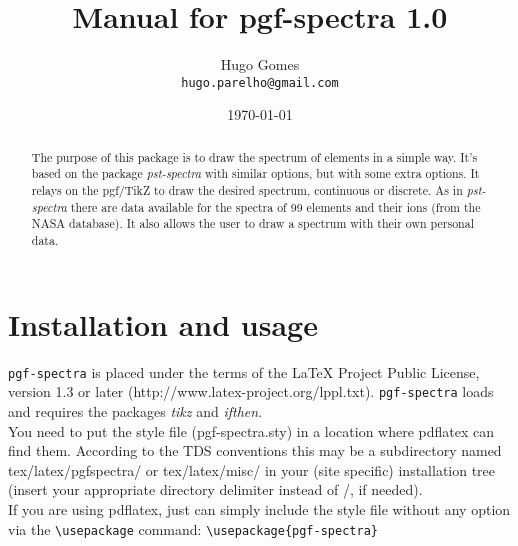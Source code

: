 \documentclass[a4paper,10pt,oneside,openany,fleqno]{article}
\def\pack{\large\texttt{pgf-spectra}\normalsize}
\begin{document}
\title{Manual for pgf-spectra 1.0}
\author{Hugo Gomes\\
  \texttt{hugo.parelho@gmail.com}}
\date{\today}
\maketitle
\begin{center}\pgfspectra[element={B},charge=all,back=visible40,gamma=.6]\end{center}
\begin{abstract}
\noindent The purpose of this package is to draw the spectrum of elements in a simple way. It's based on the package \textit{pst-spectra} with similar options, but with some extra options. It relays on the pgf/TikZ to draw the desired spectrum, continuous or discrete. As in \textit{pst-spectra} there are data available for the spectra of 99 elements and their ions (from the NASA database). It also allows the user to draw a spectrum with their own personal data.
\end{abstract}
\tableofcontents
\newpage
\section{Installation and usage}
\noindent
\pack{} is placed under the terms of the \LaTeX{} Project Public License, version 1.3 or later (http://www.latex-project.org/lppl.txt). \pack{} loads and requires the packages \textit{tikz} and \textit{ifthen}.
\\ You need to put the style file (pgf-spectra.sty) in a location where pdflatex can find them. According to the TDS conventions this may be a subdirectory named tex/latex/pgfspectra/ or tex/latex/misc/ in your (site specific) installation tree (insert your appropriate directory delimiter instead of /, if needed).
\\ If you are using pdflatex, just can simply include the style file without any option via the \verb|\usepackage| command: \verb|\usepackage{pgf-spectra}|
\end{document}
